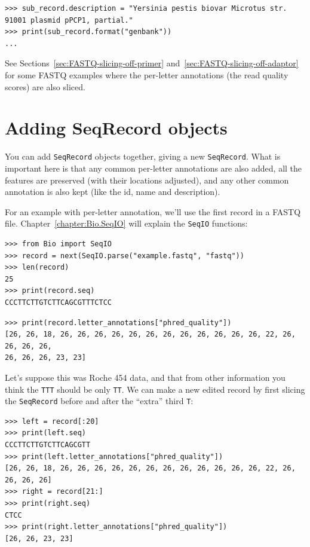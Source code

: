 \documentclass{report}
\begin{document}
\begin{verbatim}
>>> sub_record.description = "Yersinia pestis biovar Microtus str. 91001 plasmid pPCP1, partial."
>>> print(sub_record.format("genbank"))
...
\end{verbatim}

See Sections~\ref{sec:FASTQ-slicing-off-primer}
and~\ref{sec:FASTQ-slicing-off-adaptor} for some FASTQ examples where the
per-letter annotations (the read quality scores) are also sliced.

\section{Adding SeqRecord objects}
\label{sec:SeqRecord-addition}

You can add \verb|SeqRecord| objects together, giving a new \verb|SeqRecord|.
What is important here is that any common
per-letter annotations are also added, all the features are preserved (with their
locations adjusted), and any other common annotation is also kept (like the id, name
and description).

For an example with per-letter annotation, we'll use the first record in a
FASTQ file. Chapter~\ref{chapter:Bio.SeqIO} will explain the \verb|SeqIO| functions:

\begin{verbatim}
>>> from Bio import SeqIO
>>> record = next(SeqIO.parse("example.fastq", "fastq"))
>>> len(record)
25
>>> print(record.seq)
CCCTTCTTGTCTTCAGCGTTTCTCC
\end{verbatim}
\begin{verbatim}
>>> print(record.letter_annotations["phred_quality"])
[26, 26, 18, 26, 26, 26, 26, 26, 26, 26, 26, 26, 26, 26, 26, 22, 26, 26, 26, 26,
26, 26, 26, 23, 23]
\end{verbatim}

\noindent Let's suppose this was Roche 454 data, and that from other information
you think the \texttt{TTT} should be only \texttt{TT}. We can make a new edited
record by first slicing the \verb|SeqRecord| before and after the ``extra''
third \texttt{T}:

\begin{verbatim}
>>> left = record[:20]
>>> print(left.seq)
CCCTTCTTGTCTTCAGCGTT
>>> print(left.letter_annotations["phred_quality"])
[26, 26, 18, 26, 26, 26, 26, 26, 26, 26, 26, 26, 26, 26, 26, 22, 26, 26, 26, 26]
>>> right = record[21:]
>>> print(right.seq)
CTCC
>>> print(right.letter_annotations["phred_quality"])
[26, 26, 23, 23]
\end{verbatim}
\end{document}

